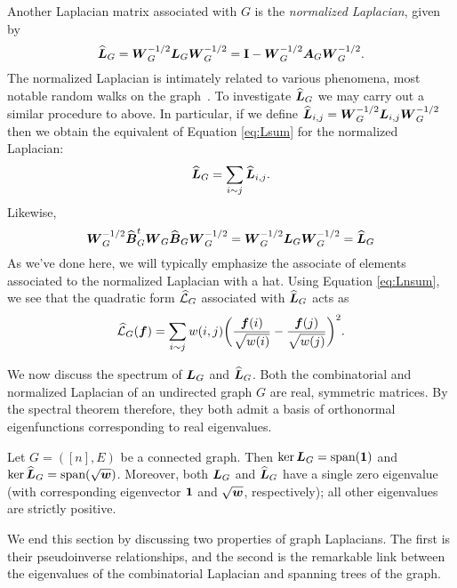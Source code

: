 Another Laplacian matrix associated with $G$ is the \emph{normalized Laplacian}, given by 
\begin{equation}
\label{eq:Ln_G}
    \widehat{\vb*{L}}_G = \vb*{W}_G^{-1/2} \vb*{L}_G\vb*{W}_G^{-1/2} = \vb{I} - \vb*{W}_G^{-1/2} \vb*{A}_G\vb*{W}_{G}^{-1/2}.
\end{equation} 
The normalized Laplacian is intimately related to various  phenomena, most notable random walks on the graph~\cite{chen2007resistance,chung1997spectral}. To investigate $\widehat{\vb*{L}}_G$ we may carry out a similar procedure to above. In particular, if we define $\widehat{\vb*{L}}_{i,j}=\vb*{W}_G^{-1/2} \vb*{L}_{i,j}\vb*{W}_G^{-1/2}$ then we obtain the equivalent of Equation \ref{eq:Lsum} for the normalized Laplacian:
\begin{equation}
\label{eq:Lnsum}
    \widehat{\vb*{L}}_G = \sum_{i\sim j}\widehat{\vb*{L}}_{i,j}.
\end{equation}
Likewise, 
\begin{equation*}
   \vb*{W}_G^{-1/2}\widehat{\vb*{B}}_G^t \vb*{W}_G\widehat{\vb*{B}}_G\vb*{W}_G^{-1/2} =  \vb*{W}_G^{-1/2}\vb*{L}_G\vb*{W}_G^{-1/2}=\widehat{\vb*{L}}_G
\end{equation*}
As we've done here, we will typically emphasize the associate of elements associated to the normalized Laplacian with a hat.
Using Equation \eqref{eq:Lnsum}, we see that 
the quadratic form $\widehat{\mathcal{L}}_G$ associated with $\widehat{\vb*{L}}_G$ acts as 
\begin{equation}
\label{eq:Lnf}
    \widehat{\mathcal{L}}_G(\vb*{f}) = \sum_{i\sim j} w(i,j)\bigg(\frac{\vb*{f}(i)}{\sqrt{w(i)}}-\frac{\vb*{f}(j)}{\sqrt{w(j)}}\bigg)^2.
\end{equation}

We now discuss  the spectrum of $\vb*{L}_G$ and $\widehat{\vb*{L}}_G$. Both the combinatorial and normalized Laplacian of an undirected graph $G$ are real, symmetric matrices. By the spectral theorem therefore, they both admit a basis of orthonormal eigenfunctions corresponding to real eigenvalues. 

\begin{lemma}
	\label{lem:laplacian_props}
	Let $G=([n],E)$ be a connected graph. Then  $\ker\vb*{L}_G=\textnormal{span}(\vb{1})$ and $\ker\widehat{\vb*{L}}_G=\textnormal{span}(\sqrt{\vb*{w}})$. Moreover, both  $\vb*{L}_G$ and $\widehat{\vb*{L}}_G$ have a single zero eigenvalue (with corresponding eigenvector $\vb{1}$ and $\sqrt{\vb*{w}}$, respectively); all other eigenvalues are strictly positive. 
\end{lemma}


We  end this section by discussing two properties of graph Laplacians. The first is  their pseudoinverse relationships, and the second is the remarkable link between the eigenvalues of the combinatorial  Laplacian and spanning trees of the graph. 

